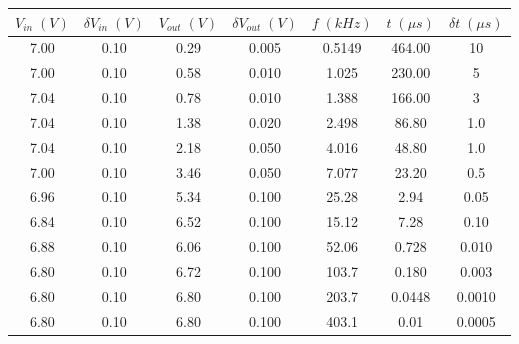 \begin{tabular}{cc|cc|ccc}
\toprule
$V_{in} \; (V)$ & $\delta V_{in} \; (V)$ & $V_{out} \; (V)$ & $\delta V_{out} \; (V)$ & $f \; (kHz)$ & $t \; (\mu s)$ & $\delta t \; (\mu s)$ \\
\midrule
           7.00 &                    0.10 &            0.29 &                   0.005 &     0.5149 &      464.00 &               10 \\
           7.00 &                    0.10 &            0.58 &                   0.010 &     1.025 &       230.00 &                5 \\
           7.04 &                    0.10 &            0.78 &                   0.010 &     1.388 &       166.00 &                3 \\
           7.04 &                    0.10 &            1.38 &                   0.020 &     2.498 &       86.80 &                1.0 \\
           7.04 &                    0.10 &            2.18 &                   0.050 &     4.016 &       48.80 &                1.0 \\
           7.00 &                    0.10 &            3.46 &                   0.050 &     7.077 &       23.20 &                0.5 \\
           6.96 &                    0.10 &            5.34 &                   0.100 &     25.28 &        2.94 &                0.05 \\
           6.84 &                    0.10 &            6.52 &                   0.100 &     15.12 &        7.28 &                0.10 \\
           6.88 &                    0.10 &            6.06 &                   0.100 &     52.06 &        0.728 &               0.010 \\
           6.80 &                    0.10 &            6.72 &                   0.100 &     103.7 &        0.180 &               0.003 \\
           6.80 &                    0.10 &            6.80 &                   0.100 &     203.7 &        0.0448 &              0.0010 \\
           6.80 &                    0.10 &            6.80 &                   0.100 &     403.1 &        0.01 &                0.0005 \\
\bottomrule
\end{tabular}

